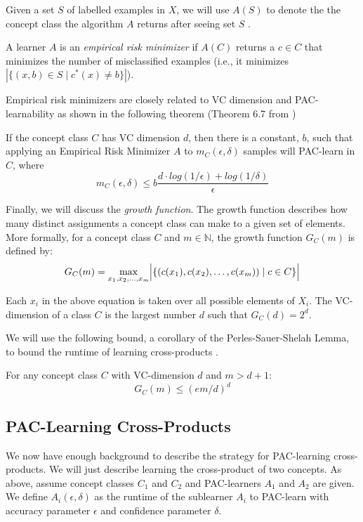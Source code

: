 Given a set $S$ of labelled examples in $X$, we will use $A(S)$ to denote the the concept class the algorithm $A$ returns after seeing set $S$ .


A learner $A$ is an \emph{empirical risk minimizer} if $A(C)$ returns a $c \in C$ that minimizes the number of misclassified examples (i.e., it minimizes $|\{(x,b) \in S \mid c^*(x) \ne b\}|$). 

Empirical risk minimizers are closely related to VC dimension and PAC-learnability as shown in the following theorem (Theorem 6.7 from \cite{shalev2014understanding})

\begin{theorem}
\label{fundpac}
If the concept class $C$ has VC dimension $d$, then there is a constant, $b$, such that applying an Empirical Risk Minimizer $A$ to $m_C(\epsilon, \delta)$ samples will PAC-learn in $C$, where
\[m_C(\epsilon, \delta) \le b \frac{d \cdot log(1/\epsilon) + log(1/\delta)}{\epsilon} \]
\end{theorem}

Finally, we will discuss the \emph{growth function}. 
The growth function describes how many distinct assignments a concept class can make to a given set of elements.  
More formally, for a concept class $C$ and $m \in \mathbb{N}$, the growth function $G_C(m)$ is defined by:
\[ G_C(m) = \max_{x_1,x_2,\dots,x_m} \abs[\Big]{\{ (c(x_1), c(x_2), \dots, c(x_m)) \mid c \in C\} }\]

Each $x_i$ in the above equation is taken over all possible elements of $X_i$.
The VC-dimension of a class $C$ is the largest number $d$ such that $G_C(d) = 2^d$. 

We will use the following bound, a corollary of the Perles-Sauer-Shelah Lemma, to bound the runtime of learning cross-products \cite{shalev2014understanding}. 

\begin{lemma}
\label{pss}
For any concept class $C$ with VC-dimension $d$ and $m > d+1$:
\[ G_C(m) \le (em/d)^d\]
\end{lemma}

\subsection{PAC-Learning Cross-Products}

We now have enough background to describe the strategy for PAC-learning cross-products.
We will just describe learning the cross-product of two concepts.  
As above, assume concept classes $C_1$ and $C_2$ and PAC-learners $A_1$ and $A_2$ are given.
We define $A_i(\epsilon, \delta)$ as the runtime of the sublearner $A_i$ to PAC-learn with accuracy parameter $\epsilon$ and confidence parameter $\delta$. 

